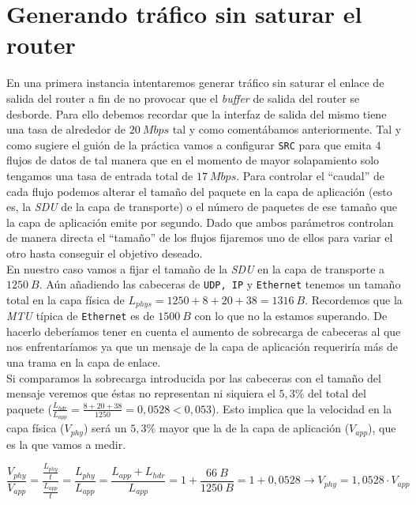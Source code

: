 \documentclass[11pt]{article}
\begin{document}
    \section{Generando tráfico sin saturar el router}
        En una primera instancia intentaremos generar tráfico sin saturar el enlace de salida del router a fin de no provocar que el \textit{buffer} de salida del router se desborde. Para ello debemos recordar que la interfaz de salida del mismo tiene una tasa de alrededor de $20\ Mbps$ tal y como comentábamos anteriormente. Tal y como sugiere el guión de la práctica vamos a configurar \texttt{SRC} para que emita $4$ flujos de datos de tal manera que en el momento de mayor solapamiento solo tengamos una tasa de entrada total de $17\ Mbps$. Para controlar el ``caudal'' de cada flujo podemos alterar el tamaño del paquete en la capa de aplicación (esto es, la \textit{SDU} de la capa de transporte) o el número de paquetes de ese tamaño que la capa de aplicación emite por segundo. Dado que ambos parámetros controlan de manera directa el ``tamaño'' de los flujos fijaremos uno de ellos para variar el otro hasta conseguir el objetivo deseado.\\

        En nuestro caso vamos a fijar el tamaño de la \textit{SDU} en la capa de transporte a $1250\ B$. Aún añadiendo las cabeceras de \texttt{UDP, IP} y \texttt{Ethernet} tenemos un tamaño total en la capa física de $L_{phys} = 1250 + 8 + 20 + 38 = 1316\ B$. Recordemos que la \textit{MTU} típica de \texttt{Ethernet} es de $1500\ B$ con lo que no la estamos superando. De hacerlo deberíamos tener en cuenta el aumento de sobrecarga de cabeceras al que nos enfrentaríamos ya que un mensaje de la capa de aplicación requeriría más de una trama en la capa de enlace.\\

        Si comparamos la sobrecarga introducida por las cabeceras con el tamaño del mensaje veremos que éstas no representan ni siquiera el $5,3\%$ del total del paquete ($\frac{L_{hdr}}{L_{app}} = \frac{8 + 20 + 38}{1250} = 0,0528 < 0,053$). Esto implica que la velocidad en la capa física ($V_{phy}$) será un $5,3\%$ mayor que la de la capa de aplicación ($V_{app}$), que es la que vamos a medir.

        $$\frac{V_{phy}}{V_{app}} = \frac{\frac{L_{phy}}{t}}{\frac{L_{app}}{t}} = \frac{L_{phy}}{L_{app}} = \frac{L_{app} + L_{hdr}}{L_{app}} = 1 + \frac{66\ B}{1250\ B} = 1 + 0,0528 \rightarrow V_{phy} = 1,0528 \cdot V_{app}$$
\end{document}
